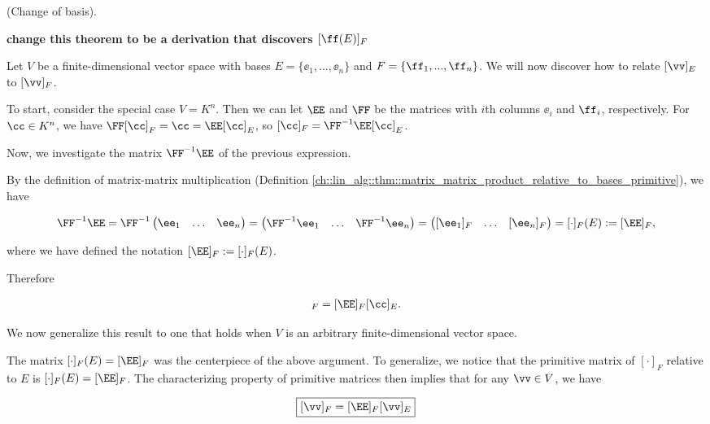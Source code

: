 \begin{theorem}
    \label{ch::lin_alg::thm::change_of_basis_for_vectors}
    
    (Change of basis).
    
    \textbf{change this theorem to be a derivation that discovers $[\ff(E)]_F$}
    
    Let $V$ be a finite-dimensional vector space with bases $E = \{\ee_1, ..., \ee_n\}$ and $F = \{\ff_1, ..., \ff_n\}$. We will now discover how to relate $[\vv]_E$ to $[\vv]_F$.
    
    To start, consider the special case $V = K^n$. Then we can let $\EE$ and $\FF$ be the matrices with $i$th columns $\ee_i$ and $\ff_i$, respectively. For $\cc \in K^n$, we have $\FF [\cc]_F = \cc = \EE [\cc]_E$, so $[\cc]_F = \FF^{-1} \EE [\cc]_E$.
    
    Now, we investigate the matrix $\FF^{-1} \EE$ of the previous expression.
    
    By the definition of matrix-matrix multiplication (Definition \ref{ch::lin_alg::thm::matrix_matrix_product_relative_to_bases_primitive}), we have
    
    \begin{align*}
        \FF^{-1} \EE = \FF^{-1} \begin{pmatrix} \ee_1 & \hdots & \ee_n \end{pmatrix} = \begin{pmatrix} \FF^{-1} \ee_1 & \hdots & \FF^{-1} \ee_n \end{pmatrix}
        = \begin{pmatrix} [\ee_1]_F & \hdots & [\ee_n]_F \end{pmatrix}
        = [\cdot]_F(E) := [\EE]_F,
    \end{align*}
    
    where we have defined the notation $[\EE]_F := [\cdot]_F(E)$.
    
    Therefore
    
    \begin{align*}
        [\cc]_F = [\EE]_F [\cc]_E.
    \end{align*}
    
    We now generalize this result to one that holds when $V$ is an arbitrary finite-dimensional vector space.
    
    The matrix $[\cdot]_F(E) = [\EE]_F$ was the centerpiece of the above argument. To generalize, we notice that the primitive matrix of $[\cdot]_F$ relative to $E$ is $[\cdot]_F(E) = [\EE]_F$. The characterizing property of primitive matrices then implies that for any $\vv \in V$, we have
    
    \begin{align*}
        \boxed
        {
            [\vv]_F = [\EE]_F [\vv]_E
        }
    \end{align*}
\end{theorem}

